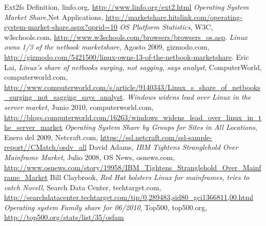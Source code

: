 \documentclass[spanish]{article}
\begin{document}
\begin{thebibliography}{99}
 Ext2fs Definition, linfo.org, \url{http://www.linfo.org/ext2.html}
 \textit{Operating System Market Share},Net Applications, \url{http://marketshare.hitslink.com/operating-system-market-share.aspx?qprid=10}
 \textit{OS Platform Statistics}, W3C, w3schools.com, \url{http://www.w3schools.com/browsers/browsers_os.asp}.
 \textit{Linux owns 1/3 of the netbook marketshare}, Agosto 2009, gizmodo.com, \url{http://gizmodo.com/5421500/linux-owns-13-of-the-netbook-marketshare}.
 Eric Lai, \textit{Linux's share of netbooks surging, not sagging, says analyst}, ComputerWorld, computerworld.com, \url{http://www.computerworld.com/s/article/9140343/Linux_s_share_of_netbooks_surging_not_sagging_says_analyst}.
 \textit{Windows widens lead over Linux in the server market}, Junio 2010, computerworld.com, \url{http://blogs.computerworld.com/16263/windows_widens_lead_over_linux_in_the_server_market}
 \textit{Operating System Share by Groups for Sites in All Locations}, Enero del 2009, Netcraft.com, \url{https://ssl.netcraft.com/ssl-sample-report//CMatch/osdv_all}
 David Adams, \textit{IBM Tightens Stranglehold Over Mainframe Market}, Julio 2008, OS News, osnews.com, \url{http://www.osnews.com/story/19958/IBM_Tightens_Stranglehold_Over_Mainframe_Market}
 Bill Claybrook, \textit{Red Hat bolsters Linux for mainframes, tries to catch Novell}, Search Data Center, techtarget.com, \url{http://searchdatacenter.techtarget.com/tip/0,289483,sid80_gci1366811,00.html}
 \textit{Operating system Family share for 06/2010}, Top500, top500.org, \url{http://top500.org/stats/list/35/osfam}



\end{thebibliography}
\end{document}
